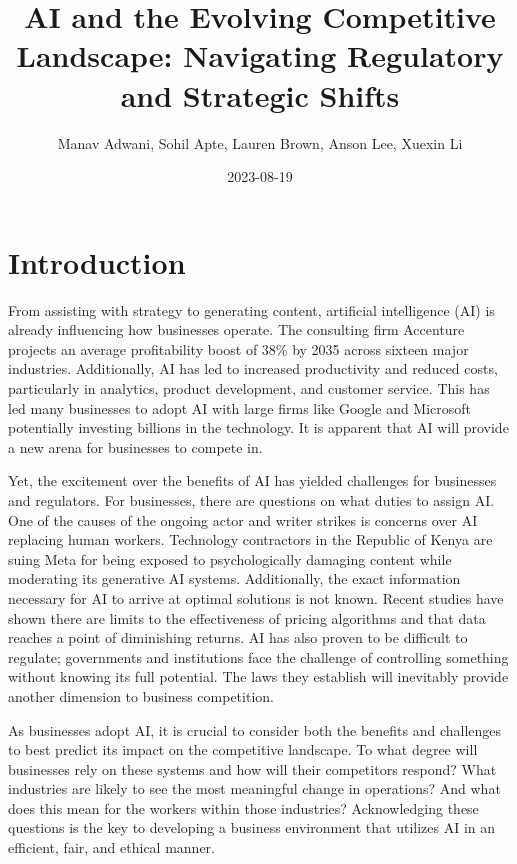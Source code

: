 \documentclass[
]{book}
\title{AI and the Evolving Competitive Landscape: Navigating Regulatory and Strategic Shifts}
\author{Manav Adwani, Sohil Apte, Lauren Brown, Anson Lee, Xuexin Li}
\date{2023-08-19}
\begin{document}
\maketitle

{
\setcounter{tocdepth}{1}
\tableofcontents
}
\hypertarget{introduction}{%
\chapter{Introduction}\label{introduction}}

From assisting with strategy to generating content, artificial intelligence (AI) is already influencing how businesses operate. The consulting firm Accenture projects an average profitability boost of 38\% by 2035 across sixteen major industries. Additionally, AI has led to increased productivity and reduced costs, particularly in analytics, product development, and customer service. This has led many businesses to adopt AI with large firms like Google and Microsoft potentially investing billions in the technology. It is apparent that AI will provide a new arena for businesses to compete in.

Yet, the excitement over the benefits of AI has yielded challenges for businesses and regulators. For businesses, there are questions on what duties to assign AI. One of the causes of the ongoing actor and writer strikes is concerns over AI replacing human workers. Technology contractors in the Republic of Kenya are suing Meta for being exposed to psychologically damaging content while moderating its generative AI systems. Additionally, the exact information necessary for AI to arrive at optimal solutions is not known. Recent studies have shown there are limits to the effectiveness of pricing algorithms and that data reaches a point of diminishing returns. AI has also proven to be difficult to regulate; governments and institutions face the challenge of controlling something without knowing its full potential. The laws they establish will inevitably provide another dimension to business competition.

As businesses adopt AI, it is crucial to consider both the benefits and challenges to best predict its impact on the competitive landscape. To what degree will businesses rely on these systems and how will their competitors respond? What industries are likely to see the most meaningful change in operations? And what does this mean for the workers within those industries? Acknowledging these questions is the key to developing a business environment that utilizes AI in an efficient, fair, and ethical manner.
\end{document}
